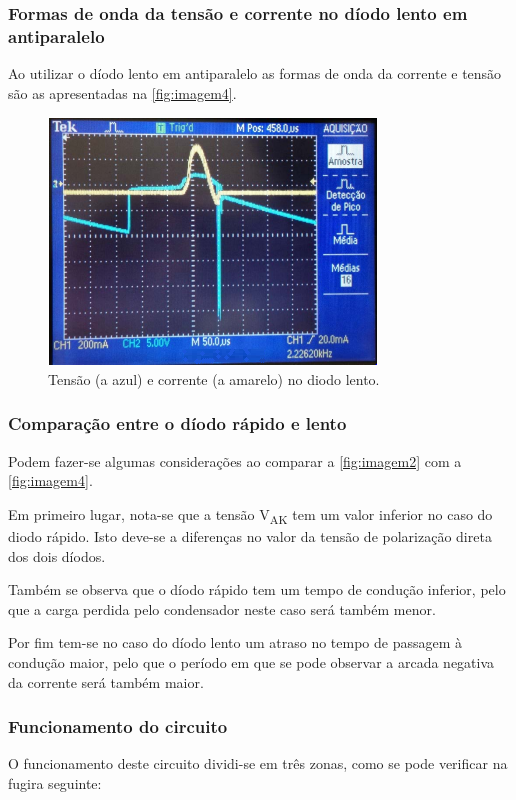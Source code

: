 \documentclass[a4paper,11pt]{article}
\numberwithin{equation}{section}
\begin{document}
\subsubsection{Formas de onda da tensão e corrente no díodo lento em antiparalelo}

Ao utilizar o díodo lento em antiparalelo as formas de onda da corrente e tensão são as apresentadas na \autoref{fig:imagem4}.

\begin{figure}[h]
	\centering
	\includegraphics[keepaspectratio=true, scale=1.25]{img/mentira}
	\caption{Tensão (a azul) e corrente (a amarelo) no diodo lento.}
	\label{fig:imagem4}
	\vspace{-0.8em}
\end{figure}

\subsubsection{Comparação entre o díodo rápido e lento}

Podem fazer-se algumas considerações ao comparar a \autoref{fig:imagem2} com a \autoref{fig:imagem4}.

Em primeiro lugar, nota-se que a tensão V\textsubscript{AK} tem um valor inferior no caso do diodo rápido. Isto deve-se a diferenças no valor da tensão de polarização direta dos dois díodos.

Também se observa que o díodo rápido tem um tempo de condução inferior, pelo que a carga perdida pelo condensador neste caso será também menor.

Por fim tem-se no caso do díodo lento um atraso no tempo de passagem à condução maior, pelo que o período em que se pode observar a arcada negativa da corrente será também maior.

\subsubsection{Funcionamento do circuito}
O funcionamento deste circuito dividi-se em três zonas, como se pode verificar na fugira seguinte:
\end{document}
